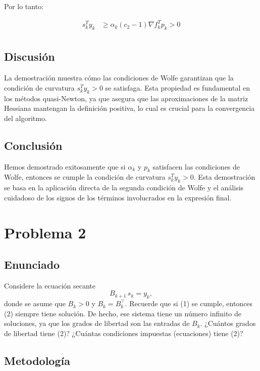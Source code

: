 \documentclass{article}
\begin{document}
Por lo tanto:

\begin{align}
    s_k^Ty_k &\geq \alpha_k(c_2 - 1) \nabla f_k^T p_k > 0 \\
\end{align}

\subsection{Discusión}

La demostración muestra cómo las condiciones de Wolfe garantizan que la condición de curvatura $s_k^T y_k > 0$ se satisfaga. Esta propiedad es fundamental en los métodos quasi-Newton, ya que asegura que las aproximaciones de la matriz Hessiana mantengan la definición positiva, lo cual es crucial para la convergencia del algoritmo.

\subsection{Conclusión}

Hemos demostrado exitosamente que si $\alpha_k$ y $p_k$ satisfacen las condiciones de Wolfe, entonces se cumple la condición de curvatura $s_k^T y_k > 0$. Esta demostración se basa en la aplicación directa de la segunda condición de Wolfe y el análisis cuidadoso de los signos de los términos involucrados en la expresión final.

\section{Problema 2}

\subsection{Enunciado}

Considere la ecuación secante
\begin{equation}\tag{2}
    B_{k+1}\, s_k = y_k,
\end{equation}
donde se asume que \(B_k > 0\) y \(B_k = B_k^{\top}\). Recuerde que si (1) se cumple, entonces (2) siempre tiene solución. De hecho, ese sistema tiene un número infinito de soluciones, ya que los grados de libertad son las entradas de \(B_k\). ¿Cuántos grados de libertad tiene (2)? ¿Cuántas condiciones impuestas (ecuaciones) tiene (2)?

\subsection{Metodología}
\end{document}
